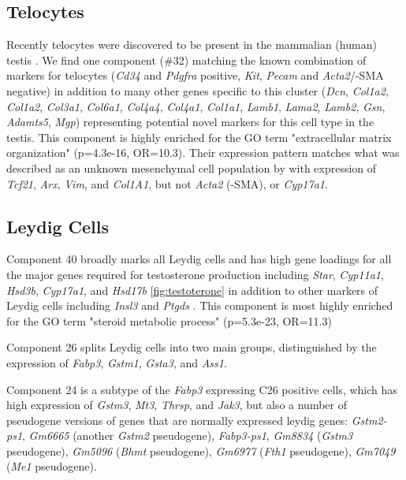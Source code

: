 \subsection{Telocytes}
Recently telocytes were discovered to be present in the mammalian (human) testis \parencite{Marini2018Reappraising, Kuroda2004Distribution}. We find one component (\#32) matching the known combination of markers for telocytes (\textit{Cd34} and \textit{Pdgfra} positive, \textit{Kit}, \textit{Pecam} and \textit{Acta2}/\textalpha-SMA negative) in addition to many other genes specific to this cluster (\textit{Dcn}, \textit{Col1a2}, \textit{Col1a2}, \textit{Col3a1}, \textit{Col6a1}, \textit{Col4a4}, \textit{Col4a1}, \textit{Col1a1}, \textit{Lamb1}, \textit{Lama2}, \textit{Lamb2}, \textit{Gsn}, \textit{Adamts5}, \textit{Mgp}) representing potential novel markers for this cell type in the testis. This component is highly enriched for the GO term "extracellular matrix organization" (p=4.3e-16, OR=10.3). Their expression pattern matches what was described as an unknown mesenchymal cell population by \cite{Green2018Comprehensive} with expression of \textit{Tcf21}, \textit{Arx}, \textit{Vim}, and \textit{Col1A1}, but not \textit{Acta2} (\textalpha-SMA), or \textit{Cyp17a1}.


\subsection{Leydig Cells}
Component 40 broadly marks all Leydig cells and has high gene loadings for all the major genes required for testosterone production including \textit{Star}, \textit{Cyp11a1}, \textit{Hsd3b}, \textit{Cyp17a1}, and \textit{Hsd17b} \ref{fig:testoterone} \cite{Stojkov2013Orally} in addition to other markers of Leydig cells including \textit{Insl3} and \textit{Ptgds} \parencite{Balvers1998RelaxinLike, Baker2001Expression}. This component is most highly enriched for the GO term "steroid metabolic process" (p=5.3e-23, OR=11.3)

Component 26 splits Leydig cells into two main groups, distinguished by the expression of \textit{Fabp3}, \textit{Gstm1}, \textit{Gsta3}, and \textit{Ass1}.

Component 24 is a subtype of the \textit{Fabp3} expressing C26 positive cells, which has high expression of \textit{Gstm3}, \textit{Mt3}, \textit{Thrsp}, and \textit{Jak3}, but also a number of pseudogene versions of genes that are normally expressed leydig genes: \textit{Gstm2-ps1}, \textit{Gm6665} (another \textit{Gstm2} pseudogene), \textit{Fabp3-ps1}, \textit{Gm8834} (\textit{Gstm3} pseudogene), \textit{Gm5096} (\textit{Bhmt} pseudogene), \textit{Gm6977} (\textit{Fth1} pseudogene), \textit{Gm7049} (\textit{Me1} pseudogene).

